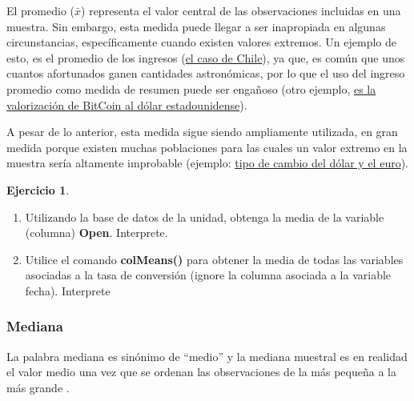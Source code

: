 \documentclass[
]{book}
\providecommand{\tightlist}{%
  \setlength{\itemsep}{0pt}\setlength{\parskip}{0pt}}
\theoremstyle{definition}
\theoremstyle{definition}
\theoremstyle{definition}
\newtheorem{exercise}{Ejercicio}[chapter]
\theoremstyle{definition}
\theoremstyle{remark}
\begin{document}
El promedio (\(\bar{x}\)) representa el valor central de las observaciones incluidas en una muestra. Sin embargo, esta medida puede llegar a ser inapropiada en algunas circunstancias, específicamente cuando existen valores extremos. Un ejemplo de esto, es el promedio de los ingresos (\href{https://www.ine.gob.cl/prensa/detalle-prensa/2022/07/21/el-ingreso-laboral-promedio-mensual-en-chile-fue-de-$681.039-en-2021\#:~:text=El\%20ingreso\%20laboral\%20promedio\%20mensual\%20en\%20Chile\%20fue\%20de\%20\%24681.039\%20en\%202021,-21\%2F07\%2F2022\&text=El\%2050\%25\%20de\%20las\%20personas,ingreso\%20de\%20hasta\%20\%24457.690\%20mensuales.}{el caso de Chile}), ya que, es común que unos cuantos afortunados ganen cantidades astronómicas, por lo que el uso del ingreso promedio como medida de resumen puede ser engañoso (otro ejemplo, \href{https://www.google.com/finance/quote/BTC-USD?sa=X\&ved=2ahUKEwi3po-_m9n8AhWUL7kGHTNFCfYQ-fUHegQIFhAe\&window=MAX}{es la valorización de BitCoin al dólar estadounidense}).

A pesar de lo anterior, esta medida sigue siendo ampliamente utilizada, en gran medida porque existen muchas poblaciones para las cuales un valor extremo en la muestra sería altamente improbable (ejemplo: \href{https://www.google.com/finance/quote/EUR-CLP?window=MAX\&comparison=USD-CLP}{tipo de cambio del dólar y el euro}).

\begin{exercise}
\leavevmode

\begin{enumerate}
\def\labelenumi{\arabic{enumi}.}
\tightlist
\item
  Utilizando la base de datos de la unidad, obtenga la media de la variable (columna) \textbf{Open}. Interprete.
\item
  Utilice el comando \textbf{colMeans()} para obtener la media de todas las variables asociadas a la tasa de conversión (ignore la columna asociada a la variable fecha). Interprete
\end{enumerate}

\end{exercise}

\hypertarget{mediana}{%
\subsubsection*{Mediana}\label{mediana}}

La palabra mediana es sinónimo de ``medio'' y la mediana muestral es en realidad el valor medio una vez que se ordenan las observaciones de la más pequeña a la más grande \citep[página 26]{Devore}.
\end{document}
